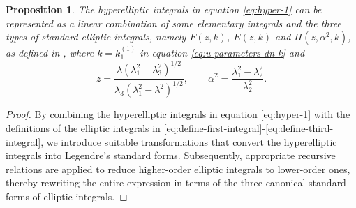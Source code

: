 \documentclass[11pt,reqno]{amsart}
\newtheorem{prop}{Proposition}
\numberwithin{equation}{section}
\begin{document}
\begin{prop}\label{prop:case-1-P}
	The hyperelliptic integrals in equation \eqref{eq:hyper-1} can be represented as a linear combination of some elementary integrals and the three types of standard elliptic integrals, namely $F(z,k)$, $E(z,k)$ and $\Pi(z,\alpha^2,k)$, as defined in , where $k=k^{(1)}_1$ in equation \eqref{eq:u-parameters-dn-k} and
	\begin{equation}\label{eq:z-k-alpha-1}
		z=\frac{\lambda(\lambda_1^2-\lambda_3^2)^{1/2}}{\lambda_3(\lambda_1^2-\lambda^2)^{1/2}}, \qquad  \alpha^2=\frac{\lambda_1^2-\lambda_2^2}{\lambda_2^2}.
	\end{equation}
\end{prop} 

\begin{proof}
	By combining the hyperelliptic integrals in equation \eqref{eq:hyper-1} with the definitions of the elliptic integrals in \eqref{eq:define-first-integral}-\eqref{eq:define-third-integral}, we introduce suitable transformations that convert the hyperelliptic integrals into Legendre’s standard forms. Subsequently, appropriate recursive relations are applied to reduce higher-order elliptic integrals to lower-order ones, thereby rewriting the entire expression in terms of the three canonical standard forms of elliptic integrals.
	

\end{proof}
\end{document}
